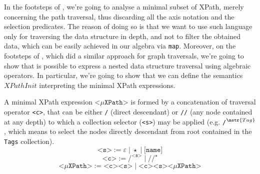 In the footsteps of \cite{Magnani06}, we're going to analyse a minimal subset of XPath, merely concerning the path traversal, thus discarding all the axis notation and the selection predicates. The reason of doing so is that we want to use such language only for traversing the data structure in depth, and not to filter the obtained data, which can be easily achieved in our algebra via \texttt{map}. Moreover, on the footsteps of \cite{NautiLOD}, which did a similar approach for graph traversals, we're going to show that is possible to express a nested data structure traversal using algebraic operators. In particular, we're going to show that we can define the semantics $XPathInit$ interpreting the minimal XPath expressions.


\begin{definition}
A minimal XPath expression $\texttt{<}\mu\texttt{XPath}\texttt{>}$ is formed by a concatenation of traversal operator \texttt{<c>}, that can be either \texttt{/} (direct descendant) or \texttt{//} (any node contained at any depth) to which a collection selector (\texttt{<s>}) may be applied (e.g. \texttt{/$^{\mstr{Tag}}$}, which means to select the nodes directly descendant from root contained in the \texttt{Tags} collection). 
\[\texttt{<s>}:=\varepsilon\; |\; \star\;|\;\texttt{[name]}\]
\[\texttt{<c>}:=\texttt{/}^\texttt{<s>}\;|\;\texttt{//}^\star\]
\[\texttt{<}\mu\texttt{XPath}\texttt{>} :=\texttt{<c>}\texttt{<s>}\;|\;\texttt{<c>}\texttt{<s>}\texttt{<}\mu\texttt{XPath}\texttt{>}\]


\end{definition}

